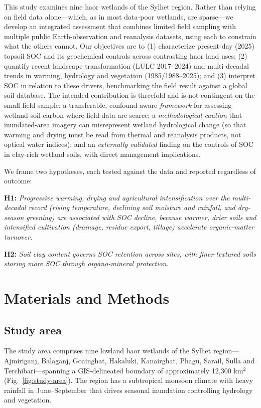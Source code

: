 \documentclass[preprint,authoryear,12pt]{elsarticle}
\begin{document}
This study examines nine haor wetlands of the Sylhet region. Rather than relying on field data
alone---which, as in most data-poor wetlands, are sparse---we develop an integrated assessment
that combines limited field sampling with multiple public Earth-observation and reanalysis
datasets, using each to constrain what the others cannot. Our objectives are to (1) characterize
present-day (2025) topsoil SOC and its geochemical controls across contrasting haor land uses;
(2) quantify recent landscape transformation (LULC 2017--2024) and multi-decadal trends in
warming, hydrology and vegetation (1985/1988--2025); and (3) interpret SOC in relation to these
drivers, benchmarking the field result against a global soil database. The intended contribution
is threefold and is not contingent on the small field sample: a transferable, confound-aware
\emph{framework} for assessing wetland soil carbon where field data are scarce; a
\emph{methodological caution} that inundated-area imagery can misrepresent wetland hydrological
change (so that warming and drying must be read from thermal and reanalysis products, not optical
water indices); and an \emph{externally validated} finding on the controls of SOC in clay-rich
wetland soils, with direct management implications.

We frame two hypotheses, each tested against the data and reported regardless of outcome:

\noindent\textbf{H1:} \textit{Progressive warming, drying and agricultural intensification over
the multi-decadal record (rising temperature, declining soil moisture and rainfall, and
dry-season greening) are associated with SOC decline, because warmer, drier soils and intensified
cultivation (drainage, residue export, tillage) accelerate organic-matter turnover.}

\noindent\textbf{H2:} \textit{Soil clay content governs SOC retention across sites, with
finer-textured soils storing more SOC through organo-mineral protection.}

\section{Materials and Methods}
\label{sec:methodology}

\subsection{Study area}
\label{subsec:study-area}
The study area comprises nine lowland haor wetlands of the Sylhet region---Ajmiriganj,
Balaganj, Goainghat, Hakaluki, Kanairghat, Phagu, Sarail, Sulla and Terchibari---spanning a
GIS-delineated boundary of approximately 12{,}300 km$^2$ (Fig.~\ref{fig:study-area}). The region
has a subtropical monsoon climate with heavy rainfall in June--September that drives seasonal
inundation controlling hydrology and vegetation.
\end{document}
